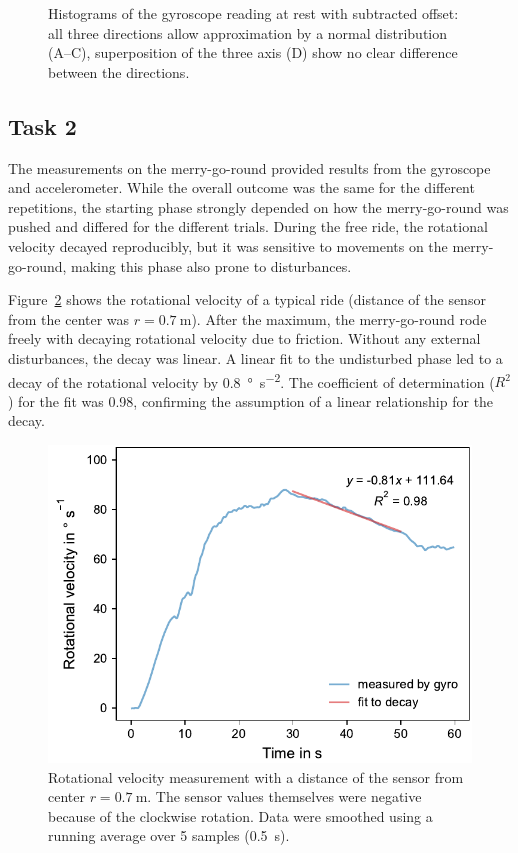 \documentclass[DIV=14]{scrarticle}
\begin{document}
\begin{figure}[h]
    \caption{Histograms of the gyroscope reading at rest with subtracted offset: all three directions allow approximation by a normal distribution (A--C), superposition of the three axis (D) show no clear difference between the directions.}
    \label{fig:gyro_hist}
\end{figure}

\clearpage


\subsection*{Task 2}
The measurements on the merry-go-round provided results from the gyroscope and accelerometer. While the overall outcome was the same for the different repetitions, the starting phase strongly depended on how the merry-go-round was pushed and differed for the different trials. During the free ride, the rotational velocity decayed reproducibly, but it was sensitive to movements on the merry-go-round, making this phase also prone to disturbances.

Figure~\ref{fig:gyro_decay} shows the rotational velocity of a typical ride (distance of the sensor from the center was $r=\SI{0.7}{\metre}$). After the maximum, the merry-go-round rode freely with decaying rotational velocity due to friction. Without any external disturbances, the decay was linear.  A linear fit to the undisturbed phase led to a decay of the rotational velocity by \SI{0.8}{\degree\per\square\second}. The coefficient of determination ($R^2$) for the fit was 0.98, confirming the assumption of a linear relationship for the decay.

\vspace{1em}

\begin{figure}[h]
    \centering
    \includegraphics[width=.6\textwidth]{plots/gyro_2_decay.pdf}
    \caption{Rotational velocity measurement with a distance of the sensor from center $r=\SI{0.7}{\metre}$. The sensor values themselves were negative because of the clockwise rotation. Data were smoothed using a running average over 5 samples (\SI{0.5}{\second}).}
    \label{fig:gyro_decay}
\end{figure}
\end{document}
